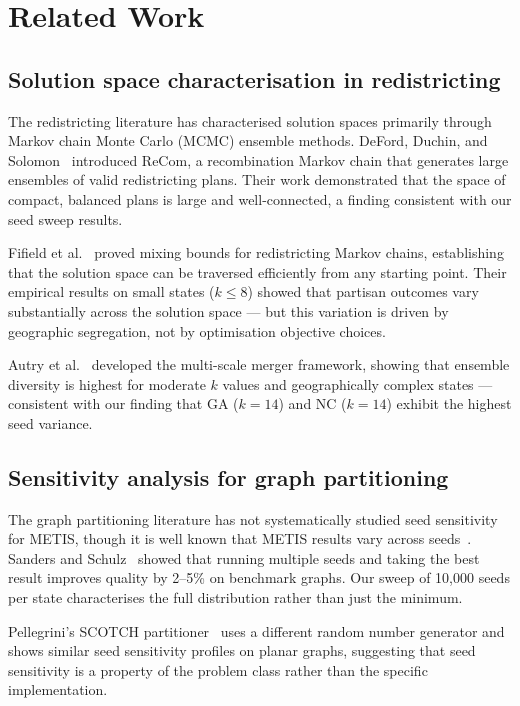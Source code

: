 \section{Related Work}
\label{sec:related}

\subsection{Solution space characterisation in redistricting}

The redistricting literature has characterised solution spaces primarily
through Markov chain Monte Carlo (MCMC) ensemble methods.
DeFord, Duchin, and Solomon~\citep{deford2019recombination} introduced
ReCom, a recombination Markov chain that generates large ensembles of
valid redistricting plans.  Their work demonstrated that the space of
compact, balanced plans is large and well-connected, a finding consistent
with our seed sweep results.

Fifield et al.~\citep{fifield2020} proved mixing bounds for redistricting
Markov chains, establishing that the solution space can be traversed
efficiently from any starting point.  Their empirical results on small
states ($k \leq 8$) showed that partisan outcomes vary substantially
across the solution space --- but this variation is driven by geographic
segregation, not by optimisation objective choices.

Autry et al.~\citep{autry2020} developed the multi-scale merger framework,
showing that ensemble diversity is highest for moderate $k$ values and
geographically complex states --- consistent with our finding that
GA ($k{=}14$) and NC ($k{=}14$) exhibit the highest seed variance.

\subsection{Sensitivity analysis for graph partitioning}

The graph partitioning literature has not systematically studied seed
sensitivity for METIS, though it is well known that METIS results vary
across seeds~\citep{karypis1998}.
Sanders and Schulz~\citep{sanders2013think} showed that running multiple
seeds and taking the best result improves quality by 2--5\% on benchmark
graphs.  Our sweep of 10,000 seeds per state characterises the full
distribution rather than just the minimum.

Pellegrini's SCOTCH partitioner~\citep{pellegrini2008scotch} uses a
different random number generator and shows similar seed sensitivity
profiles on planar graphs, suggesting that seed sensitivity is a property
of the problem class rather than the specific implementation.

